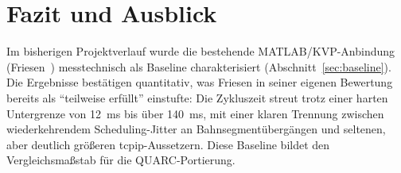 \section{Fazit und Ausblick}
\label{sec:fazit}


Im bisherigen Projektverlauf wurde die bestehende MATLAB/KVP-Anbindung
(Friesen~\cite{friesen2021}) messtechnisch als Baseline charakterisiert
(Abschnitt~\ref{sec:baseline}). Die Ergebnisse bestätigen quantitativ, was
Friesen in seiner eigenen Bewertung bereits als \enquote{teilweise erfüllt}
einstufte: Die Zykluszeit streut trotz einer harten Untergrenze von
\SI{12}{\milli\second} bis über \SI{140}{\milli\second}, mit einer klaren
Trennung zwischen wiederkehrendem Scheduling-Jitter an Bahnsegmentübergängen
und seltenen, aber deutlich größeren \ac{tcpip}-Aussetzern. Diese Baseline
bildet den Vergleichsmaßstab für die QUARC-Portierung.

